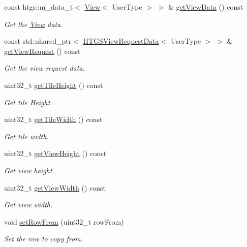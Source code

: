 \begin{DoxyCompactItemize}
const htgs\+::m\+\_\+data\+\_\+t$<$ \hyperlink{classfi_1_1View}{View}$<$ User\+Type $>$ $>$ \& \hyperlink{classfi_1_1HTGSTileRequestData_a48473c7a1136972c3026fb2df1545772}{get\+View\+Data} () const
\begin{DoxyCompactList}\small\item\em Get the \hyperlink{classfi_1_1View}{View} data. \end{DoxyCompactList}\item 
const std\+::shared\+\_\+ptr$<$ \hyperlink{classfi_1_1HTGSViewRequestData}{H\+T\+G\+S\+View\+Request\+Data}$<$ User\+Type $>$ $>$ \& \hyperlink{classfi_1_1HTGSTileRequestData_a88e1a31faeb84ccd305114b30f55c91b}{get\+View\+Request} () const
\begin{DoxyCompactList}\small\item\em Get the view request data. \end{DoxyCompactList}\item 
uint32\+\_\+t \hyperlink{classfi_1_1HTGSTileRequestData_a4e7345337a9d60ccb6f00eabac4b0032}{get\+Tile\+Height} () const
\begin{DoxyCompactList}\small\item\em Get tile Height. \end{DoxyCompactList}\item 
uint32\+\_\+t \hyperlink{classfi_1_1HTGSTileRequestData_a10db9ee1aabf369a6d1e06c95392f869}{get\+Tile\+Width} () const
\begin{DoxyCompactList}\small\item\em Get tile width. \end{DoxyCompactList}\item 
uint32\+\_\+t \hyperlink{classfi_1_1HTGSTileRequestData_adbdf59944b03ab3c42c48db52ca8a555}{get\+View\+Height} () const
\begin{DoxyCompactList}\small\item\em Get view height. \end{DoxyCompactList}\item 
uint32\+\_\+t \hyperlink{classfi_1_1HTGSTileRequestData_a7d0ff746dab75278e796decad9223cd4}{get\+View\+Width} () const
\begin{DoxyCompactList}\small\item\em Get view width. \end{DoxyCompactList}\item 
void \hyperlink{classfi_1_1HTGSTileRequestData_af601174888d365c99f2e0c4ef43ce19d}{set\+Row\+From} (uint32\+\_\+t row\+From)
\begin{DoxyCompactList}\small\item\em Set the row to copy from. \end{DoxyCompactList}\item 

\end{DoxyCompactItemize}
